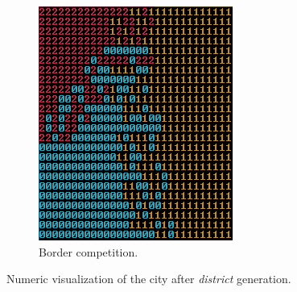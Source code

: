 \begin{figure}[h]
\begin{subfigure}{0.5\textwidth}
			\includegraphics[width=0.9\linewidth]{"Images/map borders colored"}
			\caption{Border competition.}
			\label{fig:map-borders}
		\end{subfigure}
		\caption{Numeric visualization of the city after \textit{district} generation.}
		\label{fig:map-districts-and-borders}
	\end{figure}
		
